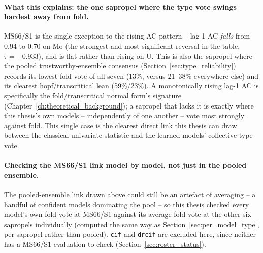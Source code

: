 \paragraph{What this explains: the one sapropel where the type vote swings hardest away from fold.} MS66/S1 is the single exception to the rising-AC pattern -- lag-1 AC \emph{falls} from 0.94 to 0.70 on Mo (the strongest and most significant reversal in the table, $\tau=-0.933$), and is flat rather than rising on U. This is also the sapropel where the pooled trustworthy-ensemble consensus (Section~\ref{sec:type_reliability}) records its lowest fold vote of all seven (13\%, versus 21--38\% everywhere else) and its clearest hopf/transcritical lean (59\%/23\%). A monotonically rising lag-1 AC is specifically the fold/transcritical normal form's signature (Chapter~\ref{ch:theoretical_background}); a sapropel that lacks it is exactly where this thesis's own models -- independently of one another -- vote most strongly against fold. This single case is the clearest direct link this thesis can draw between the classical univariate statistic and the learned models' collective type vote.

\paragraph{Checking the MS66/S1 link model by model, not just in the pooled ensemble.} The pooled-ensemble link drawn above could still be an artefact of averaging -- a handful of confident models dominating the pool -- so this thesis checked every model's own fold-vote at MS66/S1 against its average fold-vote at the other six sapropels individually (computed the same way as Section~\ref{sec:per_model_type}, per sapropel rather than pooled). \texttt{cif} and \texttt{drcif} are excluded here, since neither has a MS66/S1 evaluation to check (Section~\ref{sec:roster_status}).

